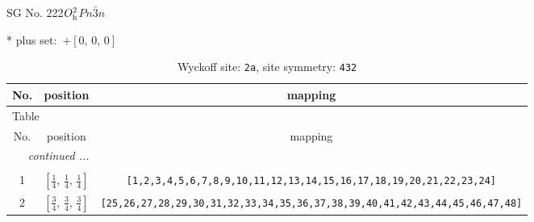 \documentclass[fleqn,8pt]{jsarticle}
\begin{document}
\setcounter{MaxMatrixCols}{32}

\renewcommand{\tablename}{Table~}
\renewcommand{\figurename}{Figure~}
\begin{center}
\LARGE
SG No. 222\quad$O_{\rm h}^{2}$\quad$Pn\bar{3}n$\quad[ cubic ]
\end{center}
* plus set:\,\,\,$+\left[ 0,\, 0,\, 0 \right]$
\renewcommand{\arraystretch}{1.2}
\begin{longtable}{ccc}
\caption{Wyckoff site: {\tt 2a}, site symmetry: {\tt 432}}
 \\
 \hline \hline
No. & position & mapping \\ \hline \endfirsthead

\multicolumn{2}{l}{\tablename\ \thetable{}} \\
 \hline \hline
No. & position & mapping \\ \hline \endhead

 \hline \hline
\multicolumn{2}{r}{\footnotesize\it continued ...} \\ \endfoot

 \hline \hline
\multicolumn{2}{r}{} \\ \endlastfoot

1 & $\left[ \frac{1}{4},\, \frac{1}{4},\, \frac{1}{4} \right]$ & {\tt [1,2,3,4,5,6,7,8,9,10,11,12,13,14,15,16,17,18,19,20,21,22,23,24]} \\ \hline
2 & $\left[ \frac{3}{4},\, \frac{3}{4},\, \frac{3}{4} \right]$ & {\tt [25,26,27,28,29,30,31,32,33,34,35,36,37,38,39,40,41,42,43,44,45,46,47,48]} \\
\end{longtable}
\renewcommand{\arraystretch}{1.2}
\end{document}
